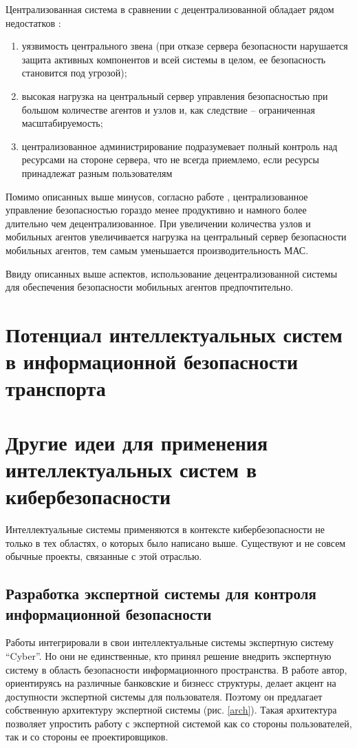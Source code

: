 Централизованная система в сравнении с децентрализованной обладает рядом недостатков \cite{probs}: %
\begin{enumerate}
    \item уязвимость центрального звена (при отказе сервера безопасности
    нарушается защита активных компонентов и всей системы в целом, ее безопасность становится под угрозой);
    \item высокая нагрузка на центральный сервер управления безопасностью при большом количестве агентов
    и узлов и, как следствие – ограниченная масштабируемость;
    \item централизованное администрирование подразумевает полный контроль над ресурсами на стороне сервера,
    что не всегда приемлемо, если ресурсы принадлежат разным пользователям
\end{enumerate}

Помимо описанных выше минусов, согласно работе \cite{mob}, централизованное управление безопасностью
гораздо менее продуктивно и намного более длительно чем децентрализованное. При увеличении количества
узлов и мобильных агентов увеличивается нагрузка на центральный
сервер безопасности мобильных агентов, тем самым уменьшается производительность МАС.

Ввиду описанных выше аспектов, использование децентрализованной системы для обеспечения
безопасности мобильных агентов предпочтительно.

\section{Потенциал интеллектуальных систем в информационной безопасности транспорта}
\newpage

\section{Другие идеи для применения интеллектуальных систем в кибербезопасности}
Интеллектуальные системы применяются в контексте кибербезопасности не только в тех областях, о которых было
написано выше. Существуют и не совсем обычные проекты, связанные с этой отраслью.

\subsection{Разработка экспертной системы для контроля информационной безопасности}
Работы \cite{scheme, ontoling} интегрировали в свои интеллектуальные системы экспертную систему ``Cyber''.
Но они не единственные, кто принял решение внедрить экспертную систему в область безопасности информационного
пространства. В работе \cite{idea} автор, ориентируясь на различные банковские и бизнесс структуры, делает акцент на
доступности экспертной системы для пользователя. Поэтому он предлагает собственную архитектуру экспертной системы
(рис. \ref{arch}). Такая архитектура позволяет упростить работу с экспертной системой как со стороны пользователей,
так и со стороны ее проектировщиков.

